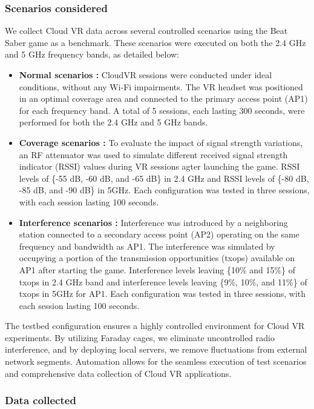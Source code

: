 \subsubsection{Scenarios considered}

We collect Cloud VR data across several controlled scenarios using the Beat Saber game as a benchmark. These scenarios were executed on both the 2.4 GHz and 5 GHz frequency bands, as detailed below:
\begin{itemize}
    \item \textbf{Normal scenarios :} CloudVR sessions were conducted under ideal conditions, without any Wi-Fi impairments. The VR headset was positioned in an optimal coverage area and connected to the primary access point (AP1) for each frequency band. A total of 5 sessions, each lasting 300 seconds, were performed for both the 2.4 GHz and 5 GHz bands.
    \item \textbf{Coverage scenarios :} To evaluate the impact of signal strength variations, an RF attenuator was used to simulate different received signal strength indicator (RSSI) values during VR sessions agter launching the game. RSSI levels of \{-55 dB, -60 dB, and -65 dB\} in 2.4 GHz and RSSI levels of \{-80 dB, -85 dB, and -90 dB\} in 5GHz. Each configuration was tested in three sessions, with each session lasting 100 seconds.

    \item \textbf{Interference scenarios :} Interference was introduced by a neighboring station connected to a secondary access point (AP2) operating on the same frequency and bandwidth as AP1. The interference was simulated by occupying a portion of the transmission opportunities (txops) available on AP1 after starting the game. Interference levels leaving \{10\% and 15\%\} of txops in 2.4 GHz band and interference levels leaving \{9\%, 10\%, and 11\%\} of txops in 5GHz for AP1. Each configuration was tested in three sessions, with each session lasting 100 seconds.
\end{itemize}

The testbed configuration ensures a highly controlled environment for Cloud VR experiments. By utilizing Faraday cages, we eliminate uncontrolled radio interference, and by deploying local servers, we remove fluctuations from external network segments. Automation allows for the seamless execution of test scenarios and comprehensive data collection of Cloud VR applications.




\subsubsection{Data collected}

